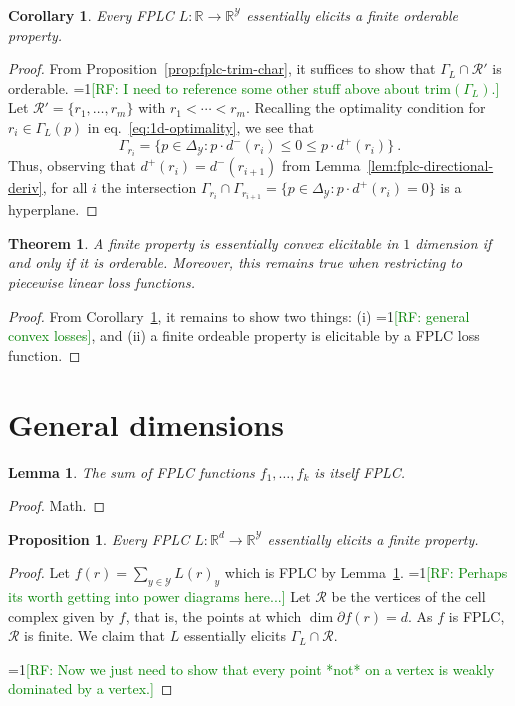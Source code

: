 \documentclass[11pt]{article}
\newcommand{\Comments}{1}
\newcommand{\mynote}[2]{\ifnum\Comments=1\textcolor{#1}{#2}\fi}
\newcommand{\raf}[1]{\mynote{green}{[RF: #1]}}
\newcommand{\reals}{\mathbb{R}}
\newcommand{\R}{\mathcal{R}}
\newcommand{\Y}{\mathcal{Y}}
\newcommand{\trim}{\mathrm{trim}}
\newtheorem{theorem}{Theorem}
\newtheorem{lemma}{Lemma}
\newtheorem{proposition}{Proposition}
\newtheorem{corollary}{Corollary}
\begin{document}
\begin{corollary}\label{cor:fplc-orderable}
  Every FPLC $L : \reals \to \reals^\Y$ essentially elicits a finite orderable property.
\end{corollary}
\begin{proof}
  From Proposition~\ref{prop:fplc-trim-char}, it suffices to show that $\Gamma_L\cap\R'$ is orderable.
  \raf{I need to reference some other stuff above about $\trim(\Gamma_L)$.}
  Let $\R' = \{r_1,\ldots,r_m\}$ with $r_1 < \cdots < r_m$.
  Recalling the optimality condition for $r_i \in \Gamma_L(p)$ in eq.~\eqref{eq:1d-optimality}, we see that
  \begin{equation*}\label{eq:fplc-level-set}
    \Gamma_{r_i} = \{ p \in \Delta_\Y : p\cdot d^-(r_i) \leq 0 \leq p\cdot d^+(r_{i}) \}~.
  \end{equation*}
  Thus, observing that $d^+(r_i) = d^-(r_{i+1})$ from Lemma~\ref{lem:fplc-directional-deriv}, for all $i$ the intersection $\Gamma_{r_i} \cap \Gamma_{r_{i+1}} = \{ p \in \Delta_\Y : p\cdot d^+(r_i) = 0\}$ is a hyperplane.
\end{proof}


\begin{theorem}\label{thm:fplc-orderable}
  A finite property is essentially convex elicitable in $1$ dimension if and only if it is orderable.
  Moreover, this remains true when restricting to piecewise linear loss functions.
\end{theorem}
\begin{proof}
  From Corollary~\ref{cor:fplc-orderable}, it remains to show two things: (i) \raf{general convex losses}, and (ii) a finite ordeable property is elicitable by a FPLC loss function.  
\end{proof}


\section{General dimensions}

\begin{lemma}\label{lem:sum-fplc}
  The sum of FPLC functions $f_1,\ldots,f_k$ is itself FPLC.
\end{lemma}
\begin{proof}
  Math.
\end{proof}

\begin{proposition}\label{cor:fplc-finite}
  Every FPLC $L : \reals^d \to \reals^\Y$ essentially elicits a finite property.
\end{proposition}
\begin{proof}
  Let $f(r) = \sum_{y\in\Y} L(r)_y$ which is FPLC by Lemma~\ref{lem:sum-fplc}.
  \raf{Perhaps its worth getting into power diagrams here...}
  Let $\R$ be the vertices of the cell complex given by $f$, that is, the points at which $\dim\partial f(r) = d$.
  As $f$ is FPLC, $\R$ is finite.
  We claim that $L$ essentially elicits $\Gamma_L\cap\R$.
  
  \raf{Now we just need to show that every point *not* on a vertex is weakly dominated by a vertex.}
\end{proof}
\end{document}
